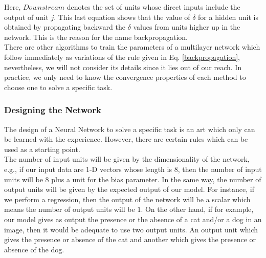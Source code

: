 Here, $Downstream$ denotes the set of units whose direct inputs include the output of unit $j$. This last equation shows that the value of $\delta$ for a hidden unit is obtained by propagating backward the $\delta$ values from units higher up in the network. This is the reason for the name backpropagation.\\

There are other algorithms to train the parameters of a multilayer network which follow immediately as variations of the rule given in Eq. \ref{backpropagation}, nevertheless, we will not consider its details since it lies out of our reach. In practice, we only need to know the convergence properties of each method to choose one to solve a specific task.

\subsubsection{Designing the Network}
The design of a Neural Network to solve a specific task is an art which only can be learned with the experience. However, there are certain rules which can be used as a starting point.\\

The number of input units will be given by the dimensionality of the network, e.g., if our input data are 1-D vectors whose length is $8$, then the number of input units will be $8$ plus a unit for the bias parameter. In the same way, the number of output units will be given by the expected output of our model. For instance, if we perform a regression, then the output of the network will be a scalar which means the number of output units will be $1$. On the other hand, if for example, our model gives as output the presence or the absence of a cat and/or a dog in an image, then it would be adequate to use two output units. An output unit which gives the presence or absence of the cat and another which gives the presence or absence of the dog.\\

